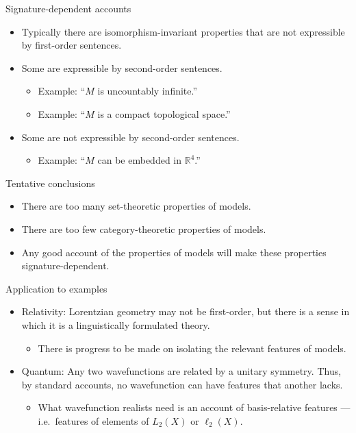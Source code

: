 \documentclass{beamer}
\begin{document}
\begin{frame}{Signature-dependent accounts}

  \begin{itemize}
  \item Typically there are isomorphism-invariant properties that are
    not expressible by first-order sentences.
  \item Some are expressible by second-order sentences.
    \begin{itemize}
    \item Example: ``$M$ is uncountably infinite.''
    \item Example: ``$M$ is a compact topological space.''
    \end{itemize}
  \item Some are not expressible by second-order sentences.
    \begin{itemize}
    \item Example: ``$M$ can be embedded in $\mathbb{R}^4$.''
    \end{itemize}
  \end{itemize}
  
\end{frame}


\begin{frame}{Tentative conclusions}

  \begin{itemize}
  \item There are too many set-theoretic properties of models.
  \item There are too few category-theoretic properties of models.
  \item Any good account of the properties of models will make these
    properties signature-dependent.
  \end{itemize}


\end{frame}


\begin{frame}{Application to examples}

  \begin{itemize}
  \item Relativity: Lorentzian geometry may not be first-order, but
    there is a sense in which it is a linguistically formulated
    theory.
    \begin{itemize}
    \item There is progress to be made on isolating the relevant
      features of models.
    \end{itemize}
  \item Quantum: Any two wavefunctions are related by a unitary
    symmetry. Thus, by standard accounts, no wavefunction can have
    features that another lacks.
    \begin{itemize}
    \item What wavefunction realists need is an account of
      basis-relative features --- i.e.\ features of elements of
      $L_2(X)$ or $\ell _2(X)$.
    \end{itemize}
  \end{itemize}

\end{frame}
\end{document}
